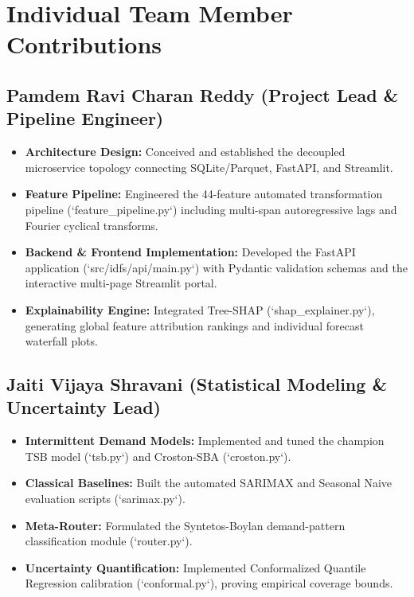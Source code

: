 \documentclass[12pt,a4paper,oneside]{report}
\theoremstyle{definition}
\begin{document}
\section{Individual Team Member Contributions}

\subsection{Pamdem Ravi Charan Reddy (Project Lead \& Pipeline Engineer)}
\begin{itemize}[itemsep=0.15cm]
    \item \textbf{Architecture Design:} Conceived and established the decoupled microservice topology connecting SQLite/Parquet, FastAPI, and Streamlit.
    \item \textbf{Feature Pipeline:} Engineered the 44-feature automated transformation pipeline (`feature_pipeline.py`) including multi-span autoregressive lags and Fourier cyclical transforms.
    \item \textbf{Backend \& Frontend Implementation:} Developed the FastAPI application (`src/idfs/api/main.py`) with Pydantic validation schemas and the interactive multi-page Streamlit portal.
    \item \textbf{Explainability Engine:} Integrated Tree-SHAP (`shap_explainer.py`), generating global feature attribution rankings and individual forecast waterfall plots.
\end{itemize}

\subsection{Jaiti Vijaya Shravani (Statistical Modeling \& Uncertainty Lead)}
\begin{itemize}[itemsep=0.15cm]
    \item \textbf{Intermittent Demand Models:} Implemented and tuned the champion TSB model (`tsb.py`) and Croston-SBA (`croston.py`).
    \item \textbf{Classical Baselines:} Built the automated SARIMAX and Seasonal Naive evaluation scripts (`sarimax.py`).
    \item \textbf{Meta-Router:} Formulated the Syntetos-Boylan demand-pattern classification module (`router.py`).
    \item \textbf{Uncertainty Quantification:} Implemented Conformalized Quantile Regression calibration (`conformal.py`), proving empirical coverage bounds.
\end{itemize}
\end{document}
